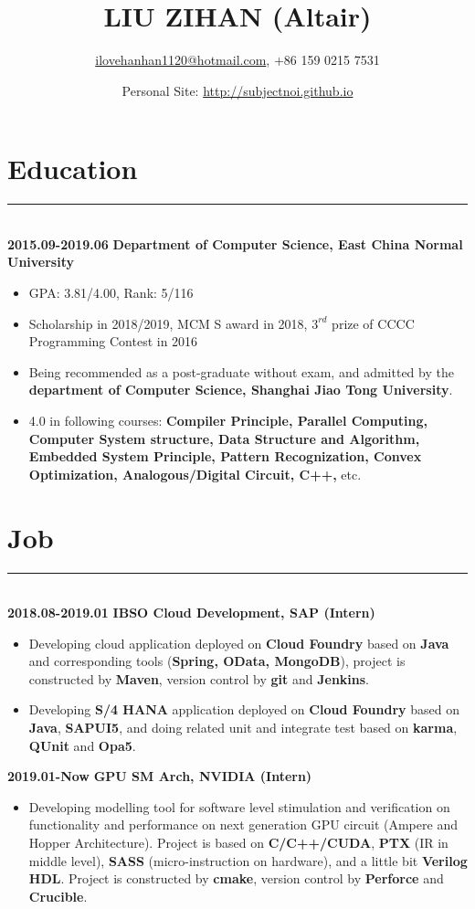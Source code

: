 \documentclass[a4paper]{article}
\title{LIU ZIHAN (Altair)}
\author{\url{ilovehanhan1120@hotmail.com}, +86 159 0215 7531}
\date{Personal Site: \url{http://subjectnoi.github.io}}
\begin{document}
		\maketitle
		\section*{Education}
		\rule[1pt]{19cm}{0.01em}\\
		\textbf{2015.09-2019.06} \hfill \textbf{Department of Computer Science, East China Normal University}
		\begin{itemize}
		\item GPA: 3.81/4.00, Rank: 5/116
		\item Scholarship in 2018/2019, MCM S award in 2018, $ 3^{rd} $ prize of CCCC Programming Contest in 2016
		\item Being recommended as a post-graduate without exam, and admitted by the \textbf{department of Computer Science, Shanghai Jiao Tong University}.
		\item 4.0 in following courses: \textbf{Compiler Principle, Parallel Computing, Computer System structure, Data Structure and Algorithm, Embedded System Principle, Pattern Recognization, Convex Optimization, Analogous/Digital Circuit, C++,} etc.
		\end{itemize}
		\section*{Job}
		\rule[1pt]{19cm}{0.01em}\\
		\textbf{2018.08-2019.01} \hfill \textbf{IBSO Cloud Development, SAP (Intern)}\\
		\begin{itemize}
		\item Developing cloud application deployed on \textbf{Cloud Foundry} based on \textbf{Java} and corresponding tools (\textbf{Spring, OData, MongoDB}), project is constructed by \textbf{Maven}, version control by \textbf{git} and \textbf{Jenkins}.
		\item Developing \textbf{S/4 HANA} application deployed on \textbf{Cloud Foundry} based on \textbf{Java}, \textbf{SAPUI5}, and doing related unit and integrate test based on \textbf{karma}, \textbf{QUnit} and \textbf{Opa5}.
		\end{itemize}
		\textbf{2019.01-Now} \hfill \textbf{GPU SM Arch, NVIDIA (Intern)}
		\begin{itemize}
		\item Developing modelling tool for software level stimulation and verification on functionality and performance on next generation GPU circuit (Ampere and Hopper Architecture). Project is based on \textbf{C/C++/CUDA}, \textbf{PTX} (IR in middle level), \textbf{SASS} (micro-instruction on hardware), and a little bit \textbf{Verilog HDL}. Project is constructed by \textbf{cmake}, version control by \textbf{Perforce} and \textbf{Crucible}.
		\end{itemize}
\end{document}
